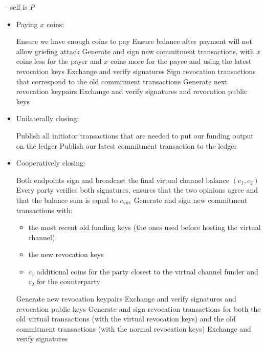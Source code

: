 \begin{center}
\begin{processbox}{\pchan -- self is $P$}
\begin{itemize}
      \item Paying $x$ coins:
      \begin{algorithmic}[0]
        \State Ensure we have enough coins to pay
          \State Ensure balance after payment will not allow griefing attack
        \EndIf
        \State Generate and sign new commitment transactions, with $x$ coins
        less for the payer and $x$ coins more for the payee and using the latest
        revocation keys
        \State Exchange and verify signatures
        \State Sign revocation transactions that correspond to the old
        commitment transactions
        \State Generate next revocation keypairs
        \State Exchange and verify signatures and revocation public keys
      \end{algorithmic}

      \item Unilaterally closing:
      \begin{algorithmic}[0]
        \State Publish all initiator transactions that are needed to put our
        funding output on the ledger
        \State Publish our latest commitment transaction to the ledger
      \end{algorithmic}

      \item Cooperatively closing:
      \begin{algorithmic}[0]
        \State {}
        \State Both endpoints sign and broadcast the final virtual channel
        balance $(c_1, c_2)$
        \State Every party verifies both signatures, ensures that the two
        opinions agree and that the balance sum is equal to $c_{\mathrm{virt}}$
        \State Generate and sign new commitment transactions with:
        \begin{itemize}
          \item the most recent old funding keys (the ones used before hosting
          the virtual channel)
          \item the new revocation keys
          \item $c_1$ additional coins for the party closest to the virtual
          channel funder and $c_2$ for the counterparty
        \end{itemize}
        \State Generate new revocation keypairs
        \State Exchange and verify signatures and revocation public keys
        \State Generate and sign revocation transactions for both the old
        virtual transactions (with the virtual revocation keys) and the old
        commitment transactions (with the normal revocation keys)
        \State Exchange and verify signatures 
      \end{algorithmic}


\end{itemize}
\end{processbox}
\end{center}
